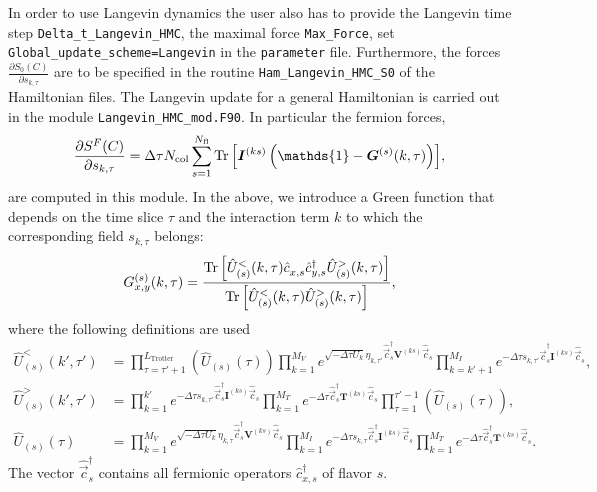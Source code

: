 In order to use Langevin dynamics the user also has to provide the Langevin time step \texttt{Delta\_t\_Langevin\_HMC},  the maximal force \texttt{Max\_Force},  set  \texttt{Global\_update\_scheme=Langevin} in the \texttt{parameter} file.  Furthermore, the   forces   $ \frac{ \partial S_{0}(C)}{\partial s_{k,\tau}}  $  are to be specified in the routine \texttt{Ham\_Langevin\_HMC\_S0}  of the Hamiltonian files.  The Langevin update   for a general Hamiltonian  is carried out in the module  \texttt{Langevin\_HMC\_mod.F90}.   In particular the  fermion forces, 
\begin{equation}
 \frac { \partial S^F(C)}{\partial s_{k,\tau} } 
 	=  \Delta \tau {N_{\mathrm{col}}} \sum\limits_{s=1}^{N_{\mathrm{fl}}} \Tr{\left[ \bm{I}^{(ks)} \left(\mathds{1} - \bm{G}^{(s)}(k,\tau) \right) \right]},
\end{equation}
are computed in this module. 
In the above, we  introduce a Green function that depends on the time slice $\tau$  and the interaction term $k$ to which the corresponding field $s_{k,\tau}$ belongs:
\begin{equation}\label{eqn:green_langevin}
G_{x,y}^{(s)}(k,\tau) = \frac{\Tr{\left[ \hat{U}_{(s)}^{<}(k,\tau) \hat{c}_{x,s}^{\phantom\dagger} \hat{c}_{y,s}^{\dagger} \hat{U}_{(s)}^{>}(k,\tau) \right]} }
{\Tr{\left[ \hat{U}_{(s)}^{<}(k,\tau)\hat{U}_{(s)}^{>}(k,\tau) \right]}},
\end{equation}
where the following definitions are used
\begin{align}
 \hat{U}_{(s)}^{<}(k',\tau') &= \prod_{\tau=\tau'+1}^{L_{\text{Trotter}}}  \left( \hat{U}_{(s)}(\tau) \right)
  \prod_{k=1}^{M_V} e^{\sqrt{-\Delta\tau U_k}  \eta_{k,\tau'} \hat{\vec{c}}_{s}^{\dagger} \bm{V}^{(ks)} \hat{\vec{c}}_{s}^{\phantom\dagger}}
\prod_{k=k'+1}^{M_I} e^{-\Delta\tau s_{k,\tau'} \hat{\vec{c}}_{s}^{\dagger} \bm{I}^{(ks)} \hat{\vec{c}}_{s}^{\phantom\dagger}}, \\
 \hat{U}_{(s)}^{>}(k',\tau') &= \prod_{k=1}^{k'} e^{-\Delta \tau s_{k,\tau'}  \hat{\vec{c}}_{s}^{\dagger} \bm{I}^{(ks)} \hat{\vec{c}}_{s}^{\phantom\dagger}}
  \prod_{k=1}^{M_T}   e^{-\Delta\tau  \hat{\vec{c}}_{s}^{\dagger} \bm{T}^{(ks)} \hat{\vec{c}}_{s}^{\phantom\dagger}} 
  \prod_{\tau=1}^{\tau'-1}  \left( \hat{U}_{(s)}(\tau) \right), \\
  \hat{U}_{(s)}(\tau) &= \prod_{k=1}^{M_V} e^{\sqrt{-\Delta\tau U_k}  \eta_{k,\tau} \hat{\vec{c}}_{s}^{\dagger} \bm{V}^{(ks)} \hat{\vec{c}}_{s}^{\phantom\dagger}} 
  \prod_{k=1}^{M_I} e^{-\Delta\tau s_{k,\tau} \hat{\vec{c}}_{s}^{\dagger} \bm{I}^{(ks)} \hat{\vec{c}}_{s}^{\phantom\dagger}}
    \prod_{k=1}^{M_T}   e^{-\Delta\tau  \hat{\vec{c}}_{s}^{\dagger} \bm{T}^{(ks)} \hat{\vec{c}}_{s}^{\phantom\dagger}} .
\end{align}
The vector $\hat{\vec{c}}_s^{\dagger}$ contains all fermionic operators $\hat{c}_{x,s}^{\dagger}$ of flavor $s$.


